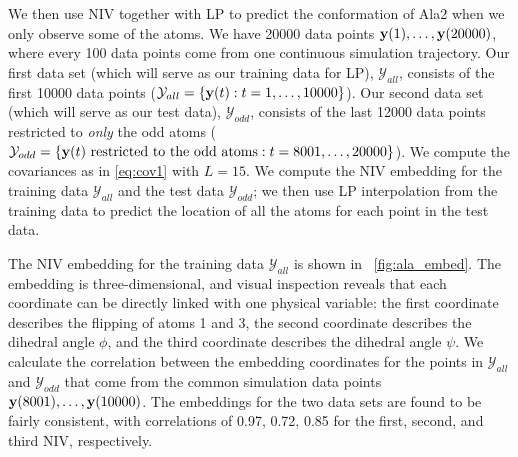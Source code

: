 We then use NIV together with LP to predict the conformation of Ala2 when we only observe some of the atoms.
%
We have 20000 data points $\mathbf{y}(1), \dots, \mathbf{y}(20000)$, where every 100 data points come from one continuous simulation trajectory.
%
Our first data set (which will serve as our training data for LP), $\mathcal{Y}_{all}$,
consists of the first 10000 data points ($\mathcal{Y}_{all} = \{\mathbf{y}(t): t=1, \dots, 10000\}$).
%
Our second data set (which will serve as our test data), $\mathcal{Y}_{odd}$, consists of the last 12000 data points restricted to {\em only} the odd atoms
($\mathcal{Y}_{odd} = \{ \mathbf{y}(t) \text{ restricted to the odd atoms}: t = 8001, \dots, 20000\}$).
%
We compute the covariances as in \eqref{eq:cov1} with $L=15$.
%
We compute the NIV embedding for the training data $\mathcal{Y}_{all}$ and the test data $\mathcal{Y}_{odd}$; we then use LP interpolation from the training data to predict the location of all the atoms for each point in the test data.

The NIV embedding for the training data $\mathcal{Y}_{all}$ is shown in \fig~\ref{fig:ala_embed}.
%
The embedding is three-dimensional, and visual inspection reveals that each coordinate can be directly linked with one physical variable:
the first coordinate describes the flipping of atoms 1 and 3, the second coordinate describes the dihedral angle $\phi$, and the third coordinate describes the dihedral angle $\psi$.
%
We calculate the correlation between the embedding coordinates for the points in $\mathcal{Y}_{all}$ and $\mathcal{Y}_{odd}$
that come from the common simulation data points $\mathbf{y}(8001), \dots, \mathbf{y}(10000)$.
%
The embeddings for the two data sets are found to be fairly consistent, with correlations of 0.97, 0.72, 0.85 for the first, second, and third NIV, respectively.

